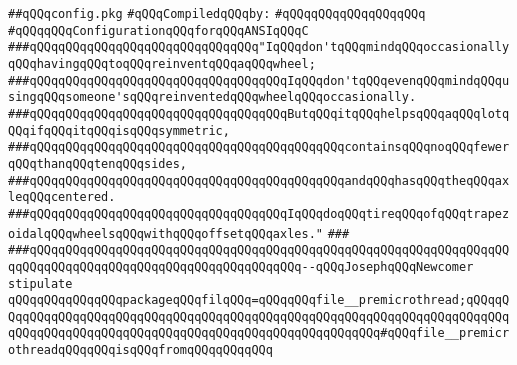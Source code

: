 \label{src/lib/c-kit/src/variants/ansi-c/config.pkg}
\verb|##qQQqconfig.pkg|\newline
\newline
\verb|#qQQqCompiledqQQqby:|\newline
\verb|#qQQqqQQqqQQqqQQqqQQq|\newline
\newline
\newline
\verb|#qQQqqQQqConfigurationqQQqforqQQqANSIqQQqC|\newline
\newline
\newline
\newline
\verb|###qQQqqQQqqQQqqQQqqQQqqQQqqQQqqQQq"IqQQqdon'tqQQqmindqQQqoccasionallyqQQqhavingqQQqtoqQQqreinventqQQqaqQQqwheel;|\newline
\verb|###qQQqqQQqqQQqqQQqqQQqqQQqqQQqqQQqqQQqIqQQqdon'tqQQqevenqQQqmindqQQqusingqQQqsomeone'sqQQqreinventedqQQqwheelqQQqoccasionally.|\newline
\verb|###qQQqqQQqqQQqqQQqqQQqqQQqqQQqqQQqqQQqButqQQqitqQQqhelpsqQQqaqQQqlotqQQqifqQQqitqQQqisqQQqsymmetric,|\newline
\verb|###qQQqqQQqqQQqqQQqqQQqqQQqqQQqqQQqqQQqqQQqqQQqcontainsqQQqnoqQQqfewerqQQqthanqQQqtenqQQqsides,|\newline
\verb|###qQQqqQQqqQQqqQQqqQQqqQQqqQQqqQQqqQQqqQQqqQQqandqQQqhasqQQqtheqQQqaxleqQQqcentered.|\newline
\verb|###qQQqqQQqqQQqqQQqqQQqqQQqqQQqqQQqqQQqIqQQqdoqQQqtireqQQqofqQQqtrapezoidalqQQqwheelsqQQqwithqQQqoffsetqQQqaxles."|\newline
\verb|###|\newline
\verb|###qQQqqQQqqQQqqQQqqQQqqQQqqQQqqQQqqQQqqQQqqQQqqQQqqQQqqQQqqQQqqQQqqQQqqQQqqQQqqQQqqQQqqQQqqQQqqQQqqQQqqQQqqQQq--qQQqJosephqQQqNewcomer|\newline
\newline
\newline
\newline
\verb|stipulate|\newline
\verb|qQQqqQQqqQQqqQQqpackageqQQqfilqQQq=qQQqqQQqfile__premicrothread;qQQqqQQqqQQqqQQqqQQqqQQqqQQqqQQqqQQqqQQqqQQqqQQqqQQqqQQqqQQqqQQqqQQqqQQqqQQqqQQqqQQqqQQqqQQqqQQqqQQqqQQqqQQqqQQqqQQqqQQqqQQqqQQq#qQQqfile__premicrothreadqQQqqQQqisqQQqfromqQQqqQQqqQQq|\newline
